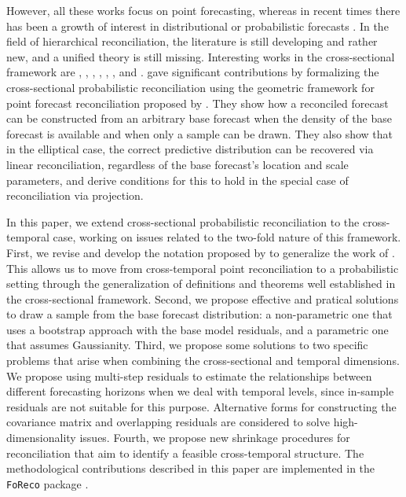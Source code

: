 \documentclass[a4paper,11pt]{article}
\theoremstyle{definition}
\begin{document}
However, all these works focus on point forecasting, whereas in recent times there has been a growth of interest in distributional or probabilistic forecasts  \citep{gneiting2014}. In the field of hierarchical reconciliation, the literature is still developing and rather new, and a unified theory is still missing. Interesting works in the cross-sectional framework are \cite{bentaieb2017}, \cite{panamtash2018}, \cite{jeon2019}, \cite{bentaieb2021}, \cite{corani2021}, \cite{corani2022}, and \cite{zambon2022}. \cite{panagiotelis2023} gave significant contributions by formalizing the cross-sectional probabilistic reconciliation using the geometric framework for point forecast reconciliation proposed by \cite{panagiotelis2021}. They show how a reconciled forecast can be constructed from an arbitrary base forecast %
when the density of the base forecast is available and when only a sample can be drawn. They also show that in the elliptical case, the correct predictive distribution can be recovered via linear reconciliation, regardless of the base forecast's location and scale parameters, and derive conditions for this to hold in the special case of reconciliation via projection.

In this paper, we extend cross-sectional probabilistic reconciliation to the cross-temporal case, working on issues related to the two-fold nature of this framework. First, we revise and develop the notation proposed by \cite{difonzo2023} to generalize the work of \cite{panagiotelis2023}. This allows us to move from cross-temporal point reconciliation to a probabilistic setting through the generalization of definitions and theorems well established in the cross-sectional framework. Second, we propose effective and pratical solutions to draw a sample from the base forecast distribution: a non-parametric one that uses a bootstrap approach with the base model residuals, and a parametric one that assumes Gaussianity. Third, we propose some solutions to two specific problems that arise when combining the cross-sectional and temporal dimensions. We propose using multi-step residuals to estimate the relationships between different forecasting horizons when we deal with temporal levels, since in-sample residuals are not suitable for this purpose. Alternative forms for constructing the covariance matrix and overlapping residuals are considered to solve high-dimensionality issues. Fourth, we propose new shrinkage procedures for reconciliation that aim to identify a feasible cross-temporal structure. The methodological contributions described in this paper are implemented in the \texttt{FoReco} package \citep{girolimetto2022}.
\end{document}
